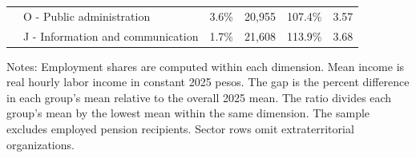 \begin{table}[!htbp]
\begin{tabular}{lp{}rrrr}
     & O - Public administration & 3.6\% & 20,955 & 107.4\% & 3.57 \\
     & J - Information and communication & 1.7\% & 21,608 & 113.9\% & 3.68 \\
    \bottomrule
  \end{tabular}
  \vspace{0.3em}
  \begin{minipage}{0.95\textwidth}
  \footnotesize
  Notes: Employment shares are computed within each dimension. Mean income is real hourly labor income in constant 2025 pesos. The gap is the percent difference in each group's mean relative to the overall 2025 mean. The ratio divides each group's mean by the lowest mean within the same dimension. The sample excludes employed pension recipients. Sector rows omit extraterritorial organizations.
  \end{minipage}
\end{table}
